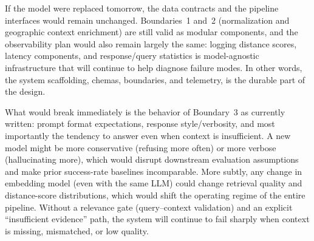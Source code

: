 \documentclass[11pt]{article}
\begin{document}
If the model were replaced tomorrow, the data contracts and the pipeline interfaces would remain unchanged. Boundaries~1 and~2 (normalization and geographic context enrichment) are still valid as modular components, and the observability plan would also remain largely the same: logging distance scores, latency components, and response/query statistics is model-agnostic infrastructure that will continue to help diagnose failure modes. In other words, the system scaffolding, chemas, boundaries, and telemetry, is the durable part of the design.

What would break immediately is the behavior of Boundary~3 as currently written: prompt format expectations, response style/verbosity, and most importantly the tendency to answer even when context is insufficient. A new model might be more conservative (refusing more often) or more verbose (hallucinating more), which would disrupt downstream evaluation assumptions and make prior success-rate baselines incomparable. More subtly, any change in embedding model (even with the same LLM) could change retrieval quality and distance-score distributions, which would shift the operating regime of the entire pipeline. Without a relevance gate (query--context validation) and an explicit ``insufficient evidence'' path, the system will continue to fail sharply when context is missing, mismatched, or low quality.
\end{document}
